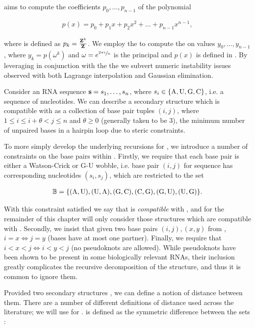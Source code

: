 \fftbor aims to compute the coefficients $p_0,\dots,p_{n-1}$ of the polynomial

\begin{align}
\label{eq:fftbor:pOfX}
p(x) = p_0 + p_1 x + p_2 x^2 + \dots + p_{n-1} x^{n-1},
\end{align}

where \pk is defined as $p_k = \frac{{\bf Z}^{k}_{}}{{\bf Z}^{}_{}}$. We employ the \fft to compute
the \idft on values $y_0,\dots,y_{n-1}$, where
$y_k = p(\omega^k)$ and $\omega = e^{\sfrac{2 \pi i}{n}}$ is the principal \nRoU and $p(x)$ is defined in
. By leveraging
\nRoUs in conjunction with the \idft the we subvert numeric instability
issues observed with both Lagrange interpolation and Gaussian elimination.

Consider an RNA sequence ${\bf s} = s_1,\dots,s_n$, where
$s_i \in \{\text{A,\,U,\,G,\,C}\}$, i.e. a sequence of nucleotides. We can describe a
secondary structure \str which is compatible with \seq as a collection of
base pair tuples $(i,j)$, where $1 \le i \le i+\theta < j \le n$ and
$\theta \ge 0$ (generally taken to be $3$), the minimum number of unpaired bases
in a hairpin loop due to steric constraints.

To more simply develop the underlying recursions for \fftbor, we introduce a
number of constraints on the base pairs within \str. Firstly, we require that
each base pair is either a Watson-Crick or G-U wobble, i.e. base pair $(i,j)$
for sequence \seq has corresponding nucleotides $(s_i,s_j)$, which are
restricted to the set

\begin{align}
\label{eq:fftbor:validBP}
\bpSet =
\{\text{(A,\,U),\,(U,\,A),\,(G,\,C),\,(C,\,G),\,(G,\,U),\,(U,\,G)}\}.
\end{align}

With
this constraint satisfied we say that \str is {\em compatible} with \seq, and
for the remainder of this chapter will only consider those structures which are
compatible with \seq.
Secondly, we insist that given two base pairs $(i,j), (x,y)$ from \str,
$i=x \iff j=y$ (bases have at most one partner). Finally, we require that
$i<x<j \iff i<y<j$ (no pseudoknots are allowed). While pseudoknots have been
shown to be present in some biologically relevant RNAs, their inclusion greatly
complicates the recursive decomposition of the structure, and thus it is common
to ignore them.

Provided two secondary structures \strST, we can define a notion of
distance between them. There are a number of different definitions of distance
used across the literature; we will use {\em \bpd} for \fftbor.
\Bpd is defined as the symmetric difference between the sets
\strST:


